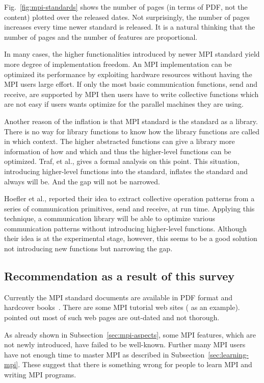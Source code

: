 \documentclass[preprint,5p,times]{elsarticle}
\begin{document}
Fig.~\ref{fig:mpi-standards} shows the number of pages (in terms of
PDF, not the content) plotted over the released dates. Not
surprisingly, the number of pages increases every time newer standard
is released. It is a natural thinking that the number of pages and the
number of features are proportional.

In many cases, the higher functionalities introduced by newer MPI
standard yield more degree of implementation freedom. An MPI
implementation can be optimized its performance by exploiting hardware
resources without having the MPI users large effort. If only the most
basic communication functions, send and receive, are supported by MPI
then users have to write collective functions which are not easy if
users wants optimize for the parallel machines they are using.

Another reason of the inflation is that MPI standard is the standard
as a library. There is no way for library functions to know how the
library functions are called in which context. The higher abstracted
functions can give a library more information of how and which and
thus the higher-level functions can be optimized. Traf, et al., gives
a formal analysis on this point\cite{5184825}.
This situation, introducing higher-level functions into the standard,
inflates the standard and always will be. And the gap will not be
narrowed.

Hoefler et al., reported their idea to extract collective operation
patterns from a series of communication primitives, send and
receive\cite{7842939}, at run time. Applying this technique, a
communication library will be able to optimize various communication
patterns without introducing higher-level functions.
Although their idea is at the experimental
stage, however, this seems to be a good solution not introducing new
functions but narrowing the gap.

\subsection{Recommendation as a result of this survey}

Currently the MPI standard documents are available in PDF format and
hardcover books~\cite{mpi-hardcover}. There are some MPI tutorial web
sites (\cite{mpi-tutorial} as an example). \cite{mpi-tutorial-intro}
pointed out most of such web pages are out-dated and not
thorough.

As already shown in Subsection~\ref{sec:mpi-aspects}, some MPI
features, which are not newly introduced, have failed to be
well-known. Further many MPI users have not enough time to master MPI
as described in Subsection~\ref{sec:learning-mpi}. These suggest that
there is something wrong for people to learn MPI and writing MPI
programs.
\end{document}
